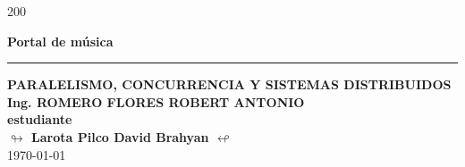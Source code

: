 \begin{titlepage}
\begin{textblock}{200}
\begin{center}
            \vspace*{\fill}
                \begin{minipage}{0.9\textwidth}
                    \centering
                    {\Large {\textbf{Portal de música}}}\par
                \end{minipage}
            \vspace*{\fill}
            \textcolor{azul}{\rule{0.5\linewidth}{0.80mm}} \par
            \vspace{8mm}
            {\large{\textbf{ PARALELISMO, CONCURRENCIA Y SISTEMAS DISTRIBUIDOS }}} \\[10pt]
            {\large{\textbf{\textcolor{azul}{Ing. ROMERO FLORES ROBERT ANTONIO }}}} \\[20pt]
            {\large{\textbf{estudiante}}}\\[10pt]
            {\large{\textbf{$\looparrowright$   Larota Pilco David Brahyan  $\looparrowleft$ }}}\\[5pt]
            \today

        \end{center}
    \end{textblock}
\end{titlepage}
%
%
%
